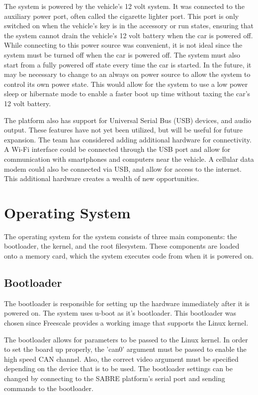 \documentclass[ece]{uw-wkrpt}
\begin{document}
The system is powered by the vehicle's 12 volt system. It was connected to the
auxiliary power port, often called the cigarette lighter port. This port is
only switched on when the vehicle's key is in the accessory or run states,
ensuring that the system cannot drain the vehicle's 12 volt battery when the car
is powered off. While connecting to this power source was convenient, it is not ideal
since the system must be turned off when the car is powered off. The system must
also start from a fully powered off state every time the car is started. In the
future, it may be necessary to change to an always on power source to allow the
system to control its own power state. This would allow for the system to use a
low power sleep or hibernate mode to enable a faster boot up time without taxing 
the car's 12 volt battery.

The platform also has support for Universal Serial Bus (USB) devices, and audio
output. These features have not yet been utilized, but will be useful for future
expansion. The team has considered adding additional hardware for connectivity.
A Wi-Fi interface could be connected through the USB port and allow for
communication with smartphones and computers near the vehicle. A cellular data
modem could also be connected via USB, and allow for access to the internet.
This additional hardware creates a wealth of new opportunities.

\section{Operating System}

The operating system for the system consists of three main components: the
bootloader, the kernel, and the root filesystem. These components are loaded
onto a memory card, which the system executes code from when it is powered on.

\subsection{Bootloader}

The bootloader is responsible for setting up the hardware immediately after it
is powered on. The system uses u-boot as it's bootloader. This bootloader was
chosen since Freescale provides a working image that supports the Linux kernel.

The bootloader allows for parameters to be passed to the Linux kernel. In order
to set the board up properly, the 'can0' argument must be passed to enable the
high speed CAN channel. Also, the correct video argument must be specified
depending on the device that is to be used. The bootloader settings can be
changed by connecting to the SABRE platform's serial port and sending commands to the
bootloader.
\end{document}
